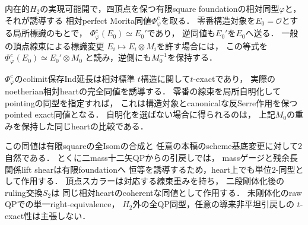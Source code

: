\begin{corollary}
\label{cor:qa-all-square-isom-pointed-heart-descent}
内在的$H_2$の実現可能開で，四頂点を保つ有限square
foundationの相対同型$\varphi$と，それが誘導する
相対perfect Morita同値$\Phi_\varphi^c$を取る．
零番構造対象を$E_0=\mathcal O$とする局所標識のもとで，
$\Phi_\varphi^c(E_0)\simeq E_0'$であり，
逆同値も$E_0'$を$E_0$へ送る．
一般の頂点線束による標識変更
$E_i\mapsto E_i\otimes M_i$を許す場合には，
この等式を$\Phi_\varphi^c(E_0)\simeq E_0'\otimes M_0$
と読み，逆側にも$M_0^{-1}$を保持する．

$\Phi_\varphi^c$のcolimit保存Ind延長は相対標準
$t$構造に関して$t$-exactであり，
実際のnoetherian相対heartの完全同値を誘導する．
零番の線束を局所自明化してpointingの同型を指定すれば，
これは構造対象とcanonicalな反Serre作用を保つ
pointed exact同値となる．
自明化を選ばない場合に得られるのは，
上記$M_0$の重みを保持した同じheartの比較である．

この同値は有限squareの全Isomの合成と
任意の本稿のscheme基底変更に対して$2$自然である．
とくに二mass十二矢QPからの引戻しでは，
massゲージと残余長関係lift shearは有限foundationへ
恒等を誘導するため，heart上でも単位$2$-同型として作用する．
頂点スカラーは対応する線束重みを持ち，
二段剛体化後のruling交換$S_2$は
同じ相対heartのcoherentな同値として作用する．
未剛体化のraw QPでの単一right-equivalence，
$H_2$外の全QP同型，任意の導来非平坦引戻しの
$t$-exact性は主張しない．
\end{corollary}
